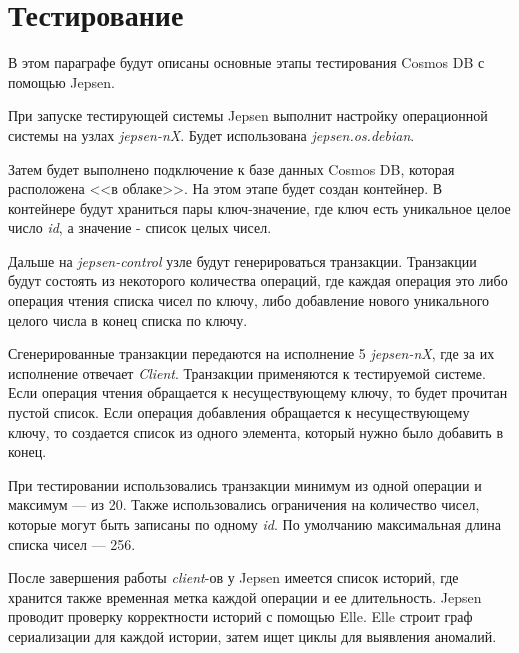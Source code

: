 \documentclass[12pt,  openany]{book}
\begin{document}
\section{Тестирование}
В этом параграфе будут описаны основные этапы тестирования Cosmos DB с помощью Jepsen. 
\par При запуске тестирующей системы Jepsen  выполнит настройку операционной системы на узлах \textit{jepsen-nX}. Будет использована \textit{jepsen.os.debian}.
\par Затем будет выполнено подключение к базе данных Cosmos DB, которая расположена <<в облаке>>. На этом этапе будет создан контейнер. В контейнере будут храниться пары ключ-значение,  где ключ есть уникальное целое число \textit{id}, а значение - список целых чисел. 
\par Дальше на \textit{jepsen-control} узле будут генерироваться транзакции. Транзакции будут состоять из некоторого количества операций, где каждая операция это либо операция чтения списка чисел по ключу, либо добавление нового уникального целого числа в конец списка по ключу. 
\par Сгенерированные транзакции передаются на исполнение 5  \textit{jepsen-nX}, где за их исполнение отвечает \textit{Client}. Транзакции применяются к тестируемой системе. Если операция чтения обращается к несуществующему ключу, то будет прочитан пустой список.  Если операция добавления обращается к несуществующему ключу, то создается список из одного элемента,  который нужно было добавить в конец.
\par При тестировании использовались транзакции минимум из одной операции и максимум --- из 20. Также использовались ограничения на количество чисел, которые могут быть записаны по одному \textit{id}. По умолчанию максимальная длина списка чисел --- 256.
\par После завершения работы \textit{client}-ов у Jepsen имеется список историй, где хранится также временная метка каждой операции и ее длительность.  Jepsen проводит проверку корректности историй с помощью Elle.  Elle строит граф сериализации для каждой истории, затем ищет циклы для выявления аномалий. 	
\end{document}
